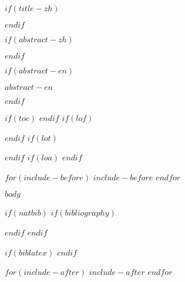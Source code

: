 \documentclass[$for(classoption)$$classoption$$sep$,$endfor$]{sjtuthesis}
\begin{document}

$if(title-zh)$
\maketitle
$endif$

\frontmatter

$if(abstract-zh)$
\begin{abstract}
$abstract-zh$
\end{abstract}
$endif$

$if(abstract-en)$
\begin{abstract*}
$abstract-en$
\end{abstract*}
$endif$

$if(toc)$
\tableofcontents
$endif$
$if(lof)$
\listoffigures*
$endif$
$if(lot)$
\listoftables*
$endif$
$if(loa)$
\listofalgorithms*
$endif$

$for(include-before)$
$include-before$
$endfor$


\mainmatter

$body$


\backmatter

$if(natbib)$
$if(bibliography)$

$endif$
$endif$

$if(biblatex)$
\printbibliography[heading=bibintoc]
$endif$

$for(include-after)$
$include-after$
$endfor$

\end{document}
